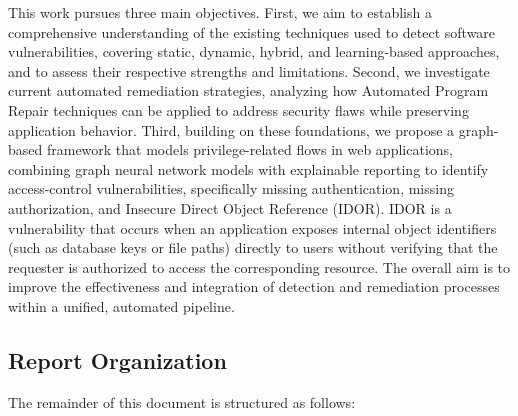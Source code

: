 This work pursues three main objectives. First, we aim to establish a comprehensive understanding of the existing techniques used to detect software vulnerabilities, covering static, dynamic, hybrid, and learning-based approaches, and to assess their respective strengths and limitations. Second, we investigate current automated remediation strategies, analyzing how Automated Program Repair techniques can be applied to address security flaws while preserving application behavior. Third, building on these foundations, we propose a graph-based framework that models privilege-related flows in web applications, combining graph neural network models with explainable reporting to identify access-control vulnerabilities, specifically missing authentication, missing authorization, and Insecure Direct Object Reference (IDOR). IDOR is a vulnerability that occurs when an application exposes internal object identifiers (such as database keys or file paths) directly to users without verifying that the requester is authorized to access the corresponding resource. The overall aim is to improve the effectiveness and integration of detection and remediation processes within a unified, automated pipeline.

\subsection*{Report Organization}
The remainder of this document is structured as follows:

